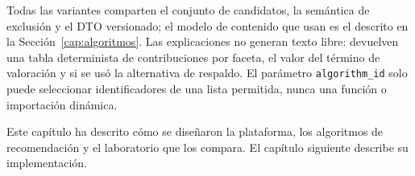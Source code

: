 Todas las variantes comparten el conjunto de candidatos, la semántica de exclusión y el DTO
versionado; el modelo de contenido que usan es el descrito en la
Sección~\ref{cap:algoritmos}. Las explicaciones no generan texto libre: devuelven una tabla
determinista de contribuciones por faceta, el valor del término de valoración y si se usó la
alternativa de respaldo. El parámetro \texttt{algorithm\_id} solo puede seleccionar identificadores de una
lista permitida, nunca una función o importación dinámica.

Este capítulo ha descrito cómo se diseñaron la plataforma, los algoritmos de recomendación y el
laboratorio que los compara. El capítulo siguiente describe su implementación.
